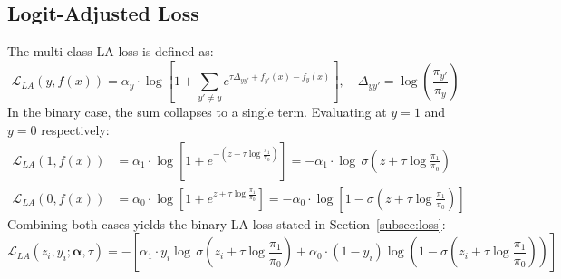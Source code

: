 \documentclass{article}
\begin{document}
\subsection{Logit-Adjusted Loss}
The multi-class LA loss is defined as:\cite{LA}
\begin{equation*}
    \mathcal{L}_{LA}(y, f(x)) = \alpha_y \cdot \log \left[1+\sum_{y'\ne y} 
    e^{\tau\Delta_{yy'} + f_{y'}(x) - f_y(x)}\right], 
    \quad \Delta_{yy'} = \log\!\left(\frac{\pi_{y'}}{\pi_y}\right)
\end{equation*}
In the binary case, the sum collapses to a single term. Evaluating at $y=1$ and $y=0$ respectively:
\begin{align*}
    \mathcal{L}_{LA}(1, f(x)) 
        &= \alpha_1 \cdot \log \left[1+ e^{-\left(z + 
           \tau\log\frac{\pi_1}{\pi_0}\right)}\right] 
        = -\alpha_1 \cdot \log\, \sigma\!\left(z + 
           \tau\log\frac{\pi_1}{\pi_0}\right) \\[6pt]
    \mathcal{L}_{LA}(0, f(x)) 
        &= \alpha_0 \cdot \log \left[1+ e^{z + 
           \tau\log\frac{\pi_1}{\pi_0}}\right]
        = -\alpha_0 \cdot \log\!\left[1-\sigma\!\left(z + 
           \tau\log\frac{\pi_1}{\pi_0}\right)\right]
\end{align*}
Combining both cases yields the binary LA loss stated in 
Section~\ref{subsec:loss}:
\begin{equation*}
    \mathcal{L}_{LA}(z_i, y_i ;\boldsymbol{\alpha}, \tau) = - \left[
    \alpha_1 \cdot y_i \log\,\sigma\!\left(z_i + \tau \log \frac{\pi_1}{\pi_0}\right) 
    + \alpha_0 \cdot (1-y_i) \log\!\left(1-\sigma\!\left(z_i + \tau 
    \log\frac{\pi_1}{\pi_0}\right)\right) \right]
\end{equation*}
\end{document}
